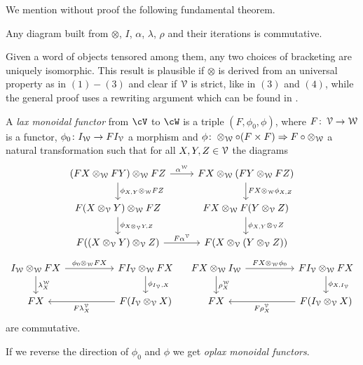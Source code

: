 \documentclass[a4paper,11pt,oneside,openany]{scrbook}
\begin{document}
We mention without proof the following fundamental theorem.

\begin{thm}
	Any diagram built from $\otimes$, $I$, $\alpha$, $\lambda$, $\rho$ and their iterations is commutative.
\end{thm}

Given a word of objects tensored among them, any two choices of bracketing are uniquely isomorphic. This result is plausible if $\otimes$ is derived from an universal property as in $(1)-(3)$ and clear if $\operatorname{\mathcal{V}}$ is strict, like in $(3)$ and $(4)$, while the general proof uses a rewriting argument which can be found in \cite{MacLane2}.

\begin{defn}
	A \emph{lax monoidal functor} from $\cV$ to $\cW$ is a triple $(F,\phi_0,\phi)$, where $F\colon\operatorname{\mathcal{V}}\rightarrow\operatorname{\mathcal{W}}$ is a functor, $\phi_0\colon I_{\operatorname{\mathcal{W}}}\rightarrow FI_{\operatorname{\mathcal{V}}}$ a morphism and $\phi\colon\otimes_{\operatorname{\mathcal{W}}}\circ(F\times F)\Rightarrow F\circ\otimes_{\operatorname{\mathcal{W}}}$ a natural transformation such that for all $X,Y,Z\in\operatorname{\mathcal{V}}$ the diagrams
	\[
		\begin{tikzcd}
			(FX\otimes_{\W}FY)\otimes_{\W}FZ\ar[r, "\alpha^{\W}"]\ar[d, "\phi_{X,Y}\otimes_{\W}FZ"]
			& FX\otimes_{\W}(FY\otimes_{\W}FZ)\ar[d, "FX\otimes_{\W}\phi_{X,Z}"] \\
			F(X\otimes_{\V}Y)\otimes_{\W}FZ\ar[d, "\phi_{X\otimes_{\V}Y,Z}"]
			& FX\otimes_{\W}F(Y\otimes_{\V}Z)\ar[d, "\phi_{X,Y}\otimes_{\V}Z"] \\
			F((X\otimes_{\V}Y)\otimes_{\V}Z)\ar[r, "F\alpha^{\V}"]
			& F(X\otimes_{\V}(Y\otimes_{\V}Z))
		\end{tikzcd}
	\]
	\[
		\begin{tikzcd}[column sep=5.0em]
			I_{\W}\otimes_{\W}FX\ar[r, "\phi_0\otimes_{\W}FX"]\ar[d, "\lambda_X^{\W}"]
			& FI_{\V}\otimes_{\W}FX\ar[d, "\phi_{I_{\V},X}"] \\
			FX
			& F(I_{\V}\otimes_{\V}X)\ar[l, "F\lambda_X^{\V}"]
		\end{tikzcd}
		\quad
		\begin{tikzcd}[column sep=5.0em]
			FX\otimes_{\W}I_{\W}\ar[r, "FX\otimes_{\W}\phi_0"]\ar[d, "\rho_X^{\W}"]
			& FI_{\V}\otimes_{\W}FX\ar[d, "\phi_{X,I_{\V}}"] \\
			FX
			& F(I_{\V}\otimes_{\V}X)\ar[l, "F\rho_X^{\V}"]
		\end{tikzcd}
	\]
	are commutative.

	If we reverse the direction of $\phi_0$ and $\phi$ we get \emph{oplax monoidal functors}.


\end{defn}
\end{document}
